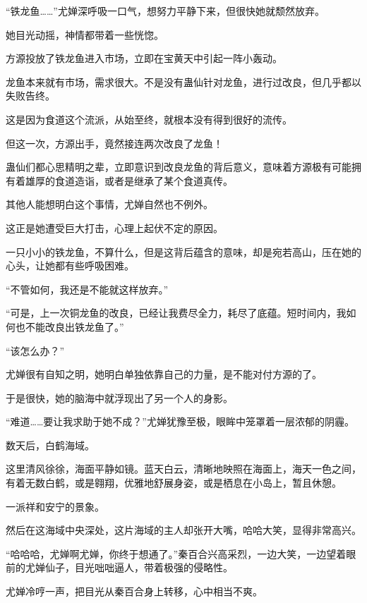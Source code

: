 
\begin{this_body}



“铁龙鱼……”尤婵深呼吸一口气，想努力平静下来，但很快她就颓然放弃。

她目光动摇，神情都带着一些恍惚。

方源投放了铁龙鱼进入市场，立即在宝黄天中引起一阵小轰动。

龙鱼本来就有市场，需求很大。不是没有蛊仙针对龙鱼，进行过改良，但几乎都以失败告终。

这是因为食道这个流派，从始至终，就根本没有得到很好的流传。

但这一次，方源出手，竟然接连两次改良了龙鱼！

蛊仙们都心思精明之辈，立即意识到改良龙鱼的背后意义，意味着方源极有可能拥有着雄厚的食道造诣，或者是继承了某个食道真传。

其他人能想明白这个事情，尤婵自然也不例外。

这正是她遭受巨大打击，心理上起伏不定的原因。

一只小小的铁龙鱼，不算什么，但是这背后蕴含的意味，却是宛若高山，压在她的心头，让她都有些呼吸困难。

“不管如何，我还是不能就这样放弃。”

“可是，上一次铜龙鱼的改良，已经让我费尽全力，耗尽了底蕴。短时间内，我如何也不能改良出铁龙鱼了。”

“该怎么办？”

尤婵很有自知之明，她明白单独依靠自己的力量，是不能对付方源的了。

于是很快，她的脑海中就浮现出了另一个人的身影。

“难道……要让我求助于她不成？”尤婵犹豫至极，眼眸中笼罩着一层浓郁的阴霾。

数天后，白鹤海域。

这里清风徐徐，海面平静如镜。蓝天白云，清晰地映照在海面上，海天一色之间，有着无数白鹤，或是翱翔，优雅地舒展身姿，或是栖息在小岛上，暂且休憩。

一派祥和安宁的景象。

然后在这海域中央深处，这片海域的主人却张开大嘴，哈哈大笑，显得非常高兴。

“哈哈哈，尤婵啊尤婵，你终于想通了。”秦百合兴高采烈，一边大笑，一边望着眼前的尤婵仙子，目光咄咄逼人，带着极强的侵略性。

尤婵冷哼一声，把目光从秦百合身上转移，心中相当不爽。


\end{this_body}
